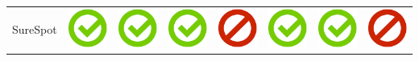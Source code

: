 \documentclass[10pt,foldmark,tumble]{leaflet}
\begin{document}
\begin{center}
{{\begin{tabular}{ L{2cm} | C{2cm} | C{2cm} | C{2cm} | C{2cm} | C{2cm} | C{2cm} | C{2cm} }
SureSpot & \includegraphics[scale=0.1]{pics/haken.png} & \includegraphics[scale=0.1]{pics/haken.png} & \includegraphics[scale=0.1]{pics/haken.png} & \includegraphics[scale=0.1]{pics/nohaken.png} & \includegraphics[scale=0.1]{pics/haken.png} & \includegraphics[scale=0.1]{pics/haken.png} & \includegraphics[scale=0.1]{pics/nohaken.png} \tabularnewline

\end{tabular}}}
\end{center}
\end{document}
